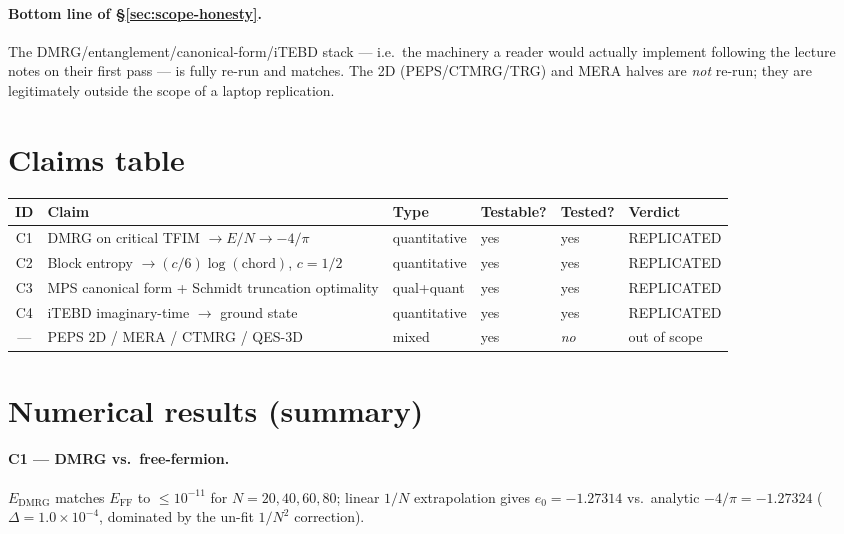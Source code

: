 \documentclass[11pt]{article}
\begin{document}
\paragraph{Bottom line of \S\ref{sec:scope-honesty}.} The DMRG/entanglement/canonical-form/iTEBD stack --- i.e.\ the machinery a reader
would actually implement following the lecture notes on their first pass --- is fully re-run and matches. The 2D (PEPS/CTMRG/TRG) and
MERA halves are \emph{not} re-run; they are legitimately outside the scope of a laptop replication.

\section{Claims table}
\begin{center}\small
\begin{tabular}{@{}clllll@{}}
\toprule
ID & Claim & Type & Testable? & Tested? & Verdict \\
\midrule
C1 & DMRG on critical TFIM $\to E/N \to -4/\pi$              & quantitative & yes & yes & REPLICATED \\
C2 & Block entropy $\to (c/6)\log(\text{chord})$, $c{=}1/2$  & quantitative & yes & yes & REPLICATED \\
C3 & MPS canonical form + Schmidt truncation optimality      & qual+quant   & yes & yes & REPLICATED \\
C4 & iTEBD imaginary-time $\to$ ground state                 & quantitative & yes & yes & REPLICATED \\
--- & PEPS 2D / MERA / CTMRG / QES-3D                         & mixed        & yes & \emph{no} & out of scope \\
\bottomrule
\end{tabular}
\end{center}

\section{Numerical results (summary)}

\paragraph{C1 --- DMRG vs.\ free-fermion.}
$E_{\text{DMRG}}$ matches $E_{\text{FF}}$ to $\le 10^{-11}$ for $N=20,40,60,80$; linear $1/N$ extrapolation gives $e_0=-1.27314$ vs.\ analytic $-4/\pi=-1.27324$
($\Delta = 1.0\times 10^{-4}$, dominated by the un-fit $1/N^2$ correction).
\end{document}
